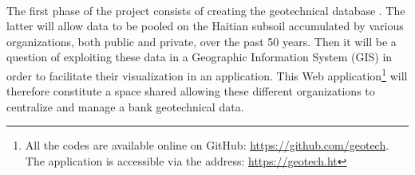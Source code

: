 \paragraph{}
The first phase of the project consists of creating the geotechnical database
. The latter will allow data to be pooled
 on the Haitian subsoil accumulated by various organizations, both public and private,
 over the past 50 years. Then it will be a question of exploiting these
 data in a Geographic Information System (GIS) in order to facilitate their visualization in an application.
  This Web application\footnote{ 
    All the codes are available online on GitHub: 
    \url{https://github.com/geotech}.
    The application is accessible via the address: 
    \url{https://geotech.ht}
    }
  will therefore constitute a space
 shared allowing these different organizations to centralize and manage a bank
 geotechnical data.

